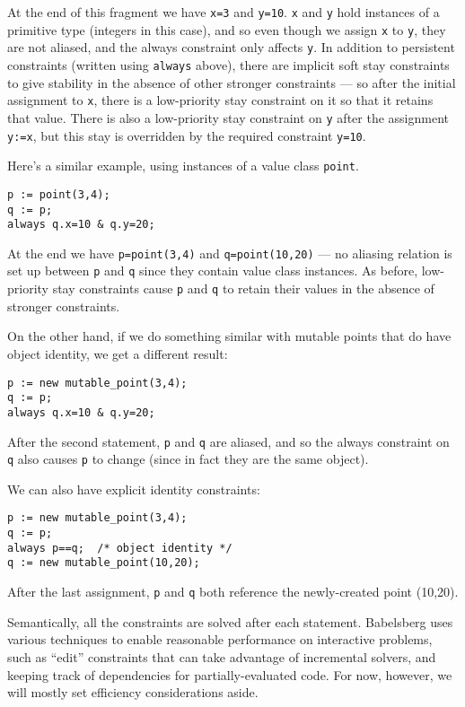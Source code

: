 \documentclass{article}
\begin{document}
At the end of this fragment we have \verb|x=3| and \verb|y=10|.
\verb|x| and \verb|y| hold instances of a primitive type (integers in
this case), and so even though we assign \verb|x| to \verb|y|, they
are not aliased, and the always constraint only affects \verb|y|.  In
addition to persistent constraints (written using \verb|always|
above), there are implicit soft stay constraints to give stability in
the absence of other stronger constraints --- so after the initial
assignment to \verb|x|, there is a low-priority stay constraint on it
so that it retains that value.  There is also a low-priority stay
constraint on \verb|y| after the assignment \verb|y:=x|, but this stay
is overridden by the required constraint \verb|y=10|.

Here's a similar example, using instances of a value class \verb|point|.
\begin{verbatim}
p := point(3,4);
q := p;
always q.x=10 & q.y=20;
\end{verbatim}
At the end we have \verb|p=point(3,4)| and \verb|q=point(10,20)| ---
no aliasing relation is set up between \verb|p| and \verb|q| since
they contain value class instances.  As before, low-priority stay
constraints cause \verb|p| and \verb|q| to retain their values in the
absence of stronger constraints.

On the other hand, if we do something similar with mutable points that
do have object identity, we get a different result:
\begin{verbatim}
p := new mutable_point(3,4);
q := p;
always q.x=10 & q.y=20;
\end{verbatim}
After the second statement, \verb|p| and  \verb|q| are aliased, and so
the always constraint on \verb|q| also causes \verb|p| to change
(since in fact they are the same object).

We can also have explicit identity constraints:
\begin{verbatim}
p := new mutable_point(3,4);
q := p;
always p==q;  /* object identity */
q := new mutable_point(10,20);
\end{verbatim}

After the last assignment, \verb|p| and \verb|q| both reference the
newly-created point (10,20).

Semantically, all the constraints are solved after each statement.
Babelsberg uses various techniques to enable reasonable performance on
interactive problems, such as ``edit'' constraints that can take
advantage of incremental solvers, and keeping track of dependencies
for partially-evaluated code.  For now, however, we will mostly set
efficiency considerations aside.
\end{document}
